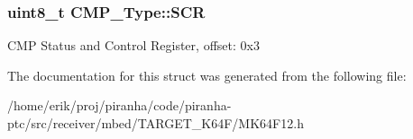 \subsubsection[{\texorpdfstring{S\+CR}{SCR}}]{ uint8\+\_\+t C\+M\+P\+\_\+\+Type\+::\+S\+CR}\hypertarget{structCMP__Type_a5ba1232e4d84912b6f6110d2b3194cb8}{}\label{structCMP__Type_a5ba1232e4d84912b6f6110d2b3194cb8}
C\+MP Status and Control Register, offset\+: 0x3 

The documentation for this struct was generated from the following file\+:\begin{DoxyCompactItemize}
\item 
/home/erik/proj/piranha/code/piranha-\/ptc/src/receiver/mbed/\+T\+A\+R\+G\+E\+T\+\_\+\+K64\+F/M\+K64\+F12.\+h\end{DoxyCompactItemize}

